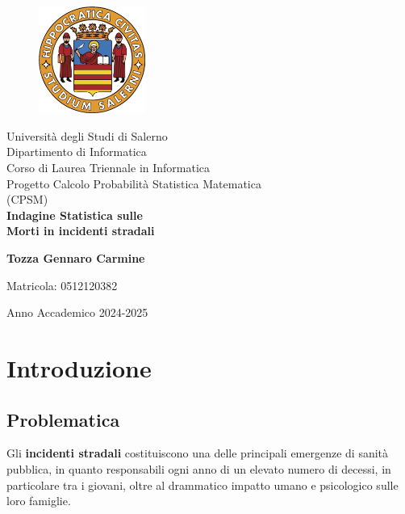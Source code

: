 \documentclass[14pt, openany, titlepage]{report} %
\begin{document}

\begin{titlepage}
\begin{center}
    \begin{figure}
        \includegraphics[width=3.5cm, height=3.5cm]{unisa.png}
        \centering
    \end{figure}
    {\Large Università degli Studi di Salerno}\\[0.2truecm]
    {\large Dipartimento di Informatica\\Corso di Laurea Triennale in Informatica}\\
    \hrulefill
    \vfill
    {\large Progetto Calcolo Probabilità Statistica Matematica\\(CPSM)}\\[0.1truecm]
    \vfill\vfill
    {\LARGE {\bf Indagine Statistica sulle\\[0.1truecm]Morti in incidenti stradali}}
    \vfill\vfill
    
    \hfill  \textbf{Tozza Gennaro Carmine}
    \centerline{\hfill Matricola: 0512120382}
    
    \vfill
    \hrulefill 
    \begin{center} Anno Accademico 2024-2025 \end{center}
\end{center}
\end{titlepage}

\tableofcontents

\chapter{Introduzione}
\section{Problematica}
Gli \textbf{incidenti stradali} costituiscono una delle principali emergenze 
di sanità pubblica, in quanto responsabili ogni anno di un elevato 
numero di decessi, in particolare tra i giovani, oltre al drammatico impatto umano e psicologico 
 sulle loro famiglie. 
\noindent
\end{document}
